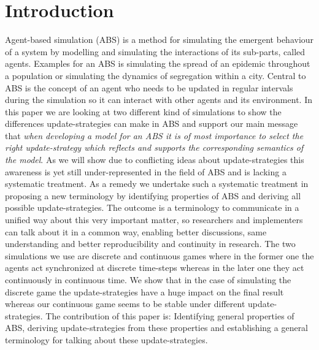 \section{Introduction}
Agent-based simulation (ABS) is a method for simulating the emergent behaviour of a system by modelling and simulating the interactions of its sub-parts, called agents. Examples for an ABS is simulating the spread of an epidemic throughout a population or simulating the dynamics of segregation within a city. Central to ABS is the concept of an agent who needs to be updated in regular intervals during the simulation so it can interact with other agents and its environment. In this paper we are looking at two different kind of simulations to show the differences update-strategies can make in ABS and support our main message that \textit{when developing a model for an ABS it is of most importance to select the right update-strategy which reflects and supports the corresponding semantics of the model}. As we will show due to conflicting ideas about update-strategies this awareness is yet still under-represented in the field of ABS and is lacking a systematic treatment. As a remedy we undertake such a systematic treatment in proposing a new terminology by identifying properties of ABS and deriving all possible update-strategies. The outcome is a terminology to communicate in a unified way about this very important matter, so researchers and implementers can talk about it in a common way, enabling better discussions, same understanding and better reproducibility and continuity in research.
The two simulations we use are discrete and continuous games where in the former one the agents act synchronized at discrete time-steps whereas in the later one they act continuously in continuous time. We show that in the case of simulating the discrete game the update-strategies have a huge impact on the final result whereas our continuous game seems to be stable under different update-strategies. The contribution of this paper is: Identifying general properties of ABS, deriving update-strategies from these properties and establishing a general terminology for talking about these update-strategies.